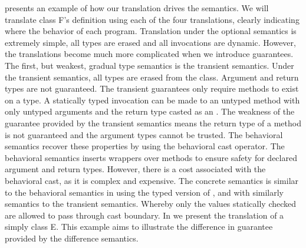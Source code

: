 \documentclass[a4paper,USenglish]{tex/lipics-v2016}
\begin{document}
 presents an example of how our translation drives the
semantics.  We will translate class {\xt F}'s definition using each of the
four translations, clearly indicating where the behavior of each program.
Translation under the optional semantics is extremely simple, all types are
erased and all invocations are dynamic. However, the translations become
much more complicated when we introduce guarantees.  The first, but weakest,
gradual type semantics is the transient semantics. Under the transient
semantics, all types are erased from the class.  Argument and return types
are not guaranteed. The transient guarantees only require methods to exist
on a type. A statically typed invocation can be made to an untyped method \m
with only untyped arguments and the return type casted as an \any.  The
weakness of the guarantee provided by the transient semantics means the
return type of a method is not guaranteed and the argument types cannot be
trusted. The behavioral semantics recover these properties by using the
behavioral cast operator. The behavioral semantics inserts wrappers over
methods to ensure safety for declared argument and return types.  However,
there is a cost associated with the behavioral cast, as it is complex and
expensive.  The concrete semantics is similar to the behavioral semantics in
using the typed version of \m, and with similarly semantics to the transient
semantics. Whereby only the values statically checked are allowed to pass
through cast boundary.  In  we present the translation
of a simply class {\xt E}. This example aims to illustrate the difference in
guarantee provided by the difference semantics.
\end{document}
